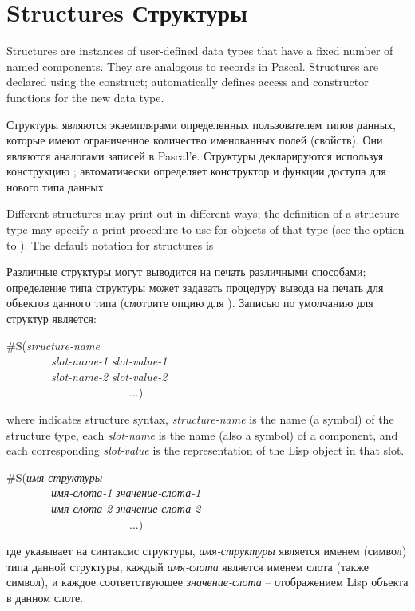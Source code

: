 \section{Structures Структуры}

Structures are instances of user-defined data types that have
a fixed number of named components.  They are analogous to
records in Pascal.
Structures are declared using the  construct;
 automatically defines access and constructor functions for
the new data type.

Структуры являются экземплярами определенных пользователем типов данных, которые
имеют ограниченное количество именованных полей (свойств). Они являются
аналогами записей в Pascal'е.
Структуры декларируются используя конструкцию ;
 автоматически определяет конструктор и функции доступа для нового
типа данных.

Different structures may print out in different ways;
the definition of a structure type may specify a print procedure
to use for objects of that type (see the
 option to ).
The default notation for structures is

Различные структуры могут выводится на печать различными способами;
определение типа структуры может задавать процедуру вывода на печать для
объектов данного типа (смотрите опцию  для ).
Записью по умолчанию для структур является:
\begin{lisp}
\#S(\emph{structure-name} \\
~~~~~~~~\emph{slot-name-1} \emph{slot-value-1} \\
~~~~~~~~\emph{slot-name-2} \emph{slot-value-2} \\
~~~~~~~~~~~~~~~~~~~~~~...)
\end{lisp}
where  indicates structure syntax, \emph{structure-name} is
the name (a symbol) of the structure type, each \emph{slot-name} is the name
(also a symbol) of a component, and each corresponding \emph{slot-value}
is the representation of the Lisp object in that slot.

\begin{lisp}
\#S(\emph{имя-структуры} \\
~~~~~~~~\emph{имя-слота-1} \emph{значение-слота-1} \\
~~~~~~~~\emph{имя-слота-2} \emph{значение-слота-2} \\
~~~~~~~~~~~~~~~~~~~~~~...)
\end{lisp}
где  указывает на синтаксис структуры, \emph{имя-структуры} является
именем (символ) типа данной структуры, каждый \emph{имя-слота} является именем
слота (также символ), и каждое соответствующее \emph{значение-слота} --
отображением Lisp объекта в данном слоте.

